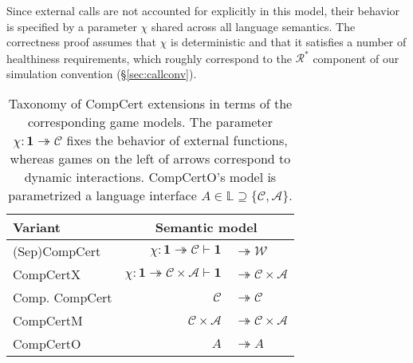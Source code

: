 \documentclass[sigplan,screen]{acmart}
\newcommand{\figsize}{\small}
\newcommand{\kw}[1]{\ensuremath{ \mathsf{#1} }}
\begin{document}
Since external calls are not accounted for explicitly
in this model,
their behavior is specified by a parameter $\chi$
shared across all language semantics.
The correctness proof assumes that $\chi$ is deterministic
and that it satisfies a number of healthiness requirements,
which roughly correspond to
the $\mathcal{R}^*$ component of our simulation convention (\S\ref{sec:callconv}).


\begin{table} %
  \caption{Taxonomy of CompCert extensions
    in terms of the corresponding game models.
    The parameter $\chi : \mathbf{1} \twoheadrightarrow \mathcal{C}$
    fixes the behavior of external functions,
    whereas games on the left of arrows
    correspond to dynamic interactions.
    CompCertO's model is parametrized a language interface
    $A \in \mathbb{L} \supseteq \{\mathcal{C}, \mathcal{A}\}$.
  }
  \label{tbl:compcerts}
  \setlength\tabcolsep{1.2pt}
  \begin{tabular}{l@{\qquad}r@{}l}
    \toprule
    Variant & \multicolumn{2}{c}{Semantic model} \\ %
    \midrule
    (Sep)CompCert \cite{compcert,sepcompcert} &
      $\chi : \mathbf{1} \twoheadrightarrow \mathcal{C}
      \vdash \mathbf{1} $ & ${} \twoheadrightarrow \mathcal{W}$ \\
    CompCertX \cite{popl15} &
      \hspace{-1em}
      $\chi : \mathbf{1} \twoheadrightarrow \mathcal{C} \times \mathcal{A}
       \vdash
       \mathbf{1} $ & ${} \twoheadrightarrow \mathcal{C} \times \mathcal{A}$
       \\
    Comp. CompCert \cite{compcompcert} &
      $\mathcal{C}$ & ${} \twoheadrightarrow \mathcal{C}$ \\
    CompCertM \cite{compcertm} &
      $\mathcal{C} \times \mathcal{A} $ & ${}\twoheadrightarrow
       \mathcal{C} \times \mathcal{A}$ \\
    CompCertO &
      $A $ & ${}\twoheadrightarrow A$ \\
    \bottomrule
  \end{tabular}
\end{table}
\end{document}
